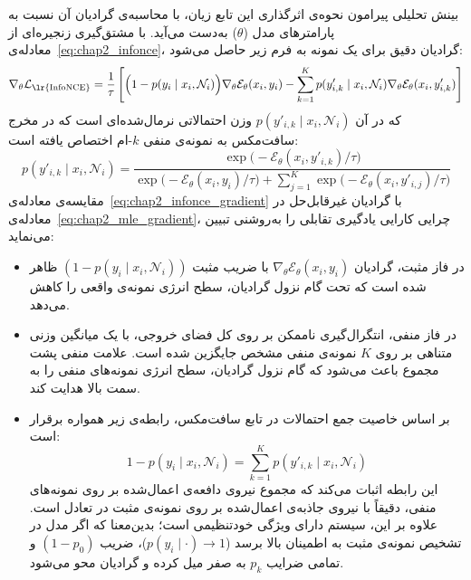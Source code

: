 بینش تحلیلی پیرامون نحوه‌ی اثرگذاری این تابع زیان، با محاسبه‌ی گرادیان آن نسبت به پارامترهای مدل ($\theta$) به‌دست می‌آید. با مشتق‌گیری زنجیره‌ای از معادله‌ی~\ref{eq:chap2_infonce}، گرادیان دقیق برای یک نمونه به فرم زیر حاصل می‌شود:
\begin{equation}\label{eq:chap2_infonce_gradient}
    \nabla_\theta \mathcal{L}_{\text{\lr{InfoNCE}}} = \frac{1}{\tau} \left[ \Big(1 - p(y_i \mid x_i, \mathcal{N}_i)\Big) \nabla_\theta \mathcal{E}_\theta(x_i, y_i) - \sum_{k=1}^K p(y'_{i, k} \mid x_i, \mathcal{N}_i) \nabla_\theta \mathcal{E}_\theta(x_i, y'_{i, k}) \right]
\end{equation}
که در آن $p(y'_{i, k} \mid x_i, \mathcal{N}_i)$ وزن احتمالاتی نرمال‌شده‌ای است که در مخرج سافت‌مکس به نمونه‌ی منفی $k$-ام اختصاص یافته است:
\begin{equation}\label{eq:chap2_infonce_neg_prob}
    p(y'_{i, k} \mid x_i, \mathcal{N}_i) = \frac{\exp\big(-\mathcal{E}_\theta(x_i, y'_{i, k})/\tau\big)}{\exp\big(-\mathcal{E}_\theta(x_i, y_i)/\tau\big) + \sum_{j=1}^K \exp\big(-\mathcal{E}_\theta(x_i, y'_{i, j})/\tau\big)}
\end{equation}
مقایسه‌ی معادله‌ی~\ref{eq:chap2_infonce_gradient} با گرادیان غیرقابل‌حل  در معادله‌ی~\ref{eq:chap2_mle_gradient}، چرایی کارایی یادگیری تقابلی را به‌روشنی تبیین می‌نماید:
\begin{itemize}
    \item در فاز مثبت، گرادیان $\nabla_\theta \mathcal{E}_\theta(x_i, y_i)$ با ضریب مثبت $(1 - p(y_i \mid x_i, \mathcal{N}_i))$ ظاهر شده است که تحت گام نزول گرادیان، سطح انرژی نمونه‌ی واقعی را کاهش می‌دهد.
    \item در فاز منفی، انتگرال‌گیری ناممکن بر روی کل فضای خروجی، با یک میانگین وزنی متناهی بر روی $K$ نمونه‌ی منفی مشخص جایگزین شده است. علامت منفی پشت مجموع باعث می‌شود که گام نزول گرادیان، سطح انرژی نمونه‌های منفی را به سمت بالا هدایت کند.
    \item بر اساس خاصیت جمع احتمالات در تابع سافت‌مکس، رابطه‌ی زیر همواره برقرار است:
    \begin{equation}\label{eq:chap2_prob_balance}
        1 - p(y_i \mid x_i, \mathcal{N}_i) = \sum_{k=1}^K p(y'_{i, k} \mid x_i, \mathcal{N}_i)
    \end{equation}
    این رابطه اثبات می‌کند که مجموع نیروی دافعه‌ی اعمال‌شده بر روی نمونه‌های منفی، دقیقاً با نیروی جاذبه‌ی اعمال‌شده بر روی نمونه‌ی مثبت در تعادل است. علاوه بر این، سیستم دارای ویژگی خودتنظیمی است؛ بدین‌معنا که اگر مدل در تشخیص نمونه‌ی مثبت به اطمینان بالا برسد ($p(y_i \mid \cdot) \to 1$)، ضریب $(1 - p_0)$ و تمامی ضرایب $p_k$ به صفر میل کرده و گرادیان محو می‌شود.
\end{itemize}

